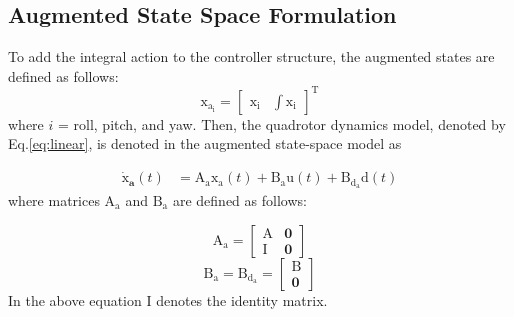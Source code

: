 \documentclass[3p,times]{elsarticle}
\begin{document}
\subsection{Augmented State Space Formulation}
\noindent To add the integral action to the controller structure, the augmented states are defined as follows:
\begin{equation}\label{lqidg_x}
    \boldsymbol{\mathrm{x_{a_i}}} = \begin{bmatrix}
        \boldsymbol{\mathrm{x_i}} &
        \displaystyle \int \boldsymbol{\mathrm{x_i}}
    \end{bmatrix}^\mathrm{T}
\end{equation}
where $i$ = roll, pitch, and yaw.
Then, the quadrotor dynamics model, denoted by Eq.\eqref{eq:linear}, is denoted in the augmented state-space model as

\begin{equation}\label{systemlqidg}
	\begin{split}
		\boldsymbol{\dot{\mathrm{x}}_a}(t) &= \boldsymbol{\mathrm{A_ax_a}}(t) + \boldsymbol{\mathrm{B_{{a}}u}}(t) + \boldsymbol{\mathrm{B_{{d_a}}d}}(t)%
	\end{split}
\end{equation}
where matrices $\boldsymbol{\mathrm{A_a}}$ and $\boldsymbol{\mathrm{B_a}}$ are defined as follows:

\begin{equation}
	\boldsymbol{\mathrm{A_a}} = \begin{bmatrix}
		\boldsymbol{\mathrm{A}} & \boldsymbol{0}\\
		\boldsymbol{\mathrm{I}} & \boldsymbol{0}
	\end{bmatrix}
\end{equation}
\begin{equation}
	\boldsymbol{\mathrm{B_a}} = \boldsymbol{\mathrm{B_{{d_a}}}} = \begin{bmatrix}
		\boldsymbol{\mathrm{B}}\\
		\boldsymbol{0}
	\end{bmatrix}
\end{equation}
In the above equation $\boldsymbol{\mathrm{I}}$ denotes the identity matrix.
\end{document}
